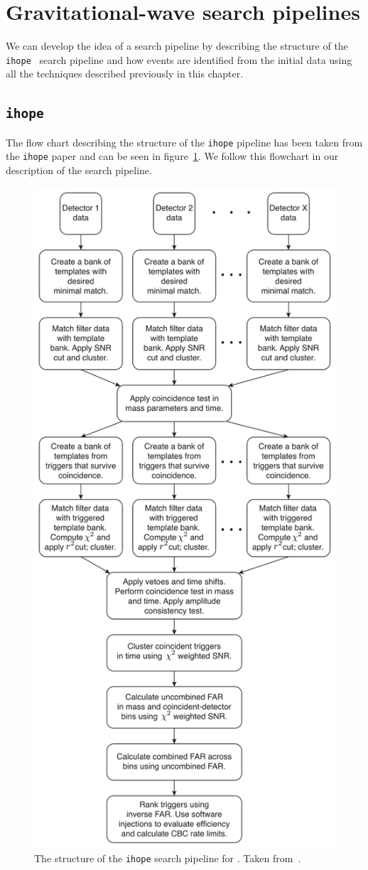\section{\label{2:sec:gw-pipelines}Gravitational-wave search pipelines}

We can develop the idea of a \gwadj search pipeline by describing the structure of the \texttt{ihope}~\cite{IHOPE:2012zx} search pipeline and how \gwadj events are identified from the initial \gwadj data using all the techniques described previously in this chapter.

\subsection{\label{2:sec:searching-for-gw-with-ihope}\texttt{ihope}}
The flow chart describing the structure of the \texttt{ihope} pipeline has been taken from the \texttt{ihope} paper and can be seen in figure~\ref{2:fig:ihope-flowchart}. We follow this flowchart in our description of the search pipeline.
%
\begin{figure}
    \centering
    \includegraphics[width=0.6\linewidth]{images/2_searches/ihope_flowchart.pdf}
    \caption{The structure of the \texttt{ihope} search pipeline for \gws. Taken from~\cite{IHOPE:2012zx}.}
    \label{2:fig:ihope-flowchart}
\end{figure}


